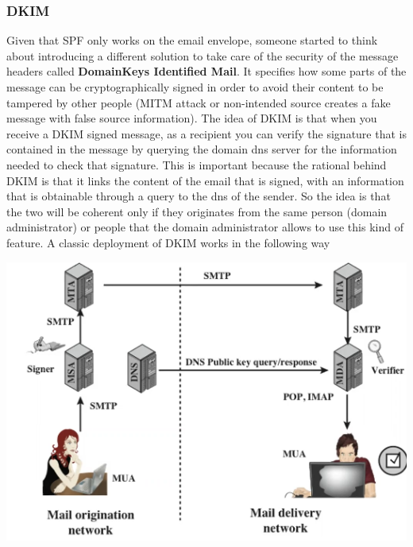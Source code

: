 \subsubsection{DKIM}
Given that SPF only works on the email envelope, someone started to think about introducing a different solution to take care of the security of the message headers called \textbf{DomainKeys Identified Mail}. It specifies how some parts of the message can be cryptographically signed in order to avoid their content to be tampered by other people (MITM attack or non-intended source creates a fake message with false source information). The idea of DKIM is that when you receive a DKIM signed message, as a recipient you can verify the signature that is contained in the message by querying the domain dns server for the information needed to check that signature. This is important because the rational behind DKIM is that it links the content of the email that is signed, with an information that is obtainable through a query to the dns of the sender. So the idea is that the two will be coherent only if they originates from the same person (domain administrator) or people that the domain administrator allows to use this kind of feature. A classic deployment of DKIM works in the following way
\begin{center}
\includegraphics[scale=0.35]{./images/dkim_deployment.png}
\end{center}
